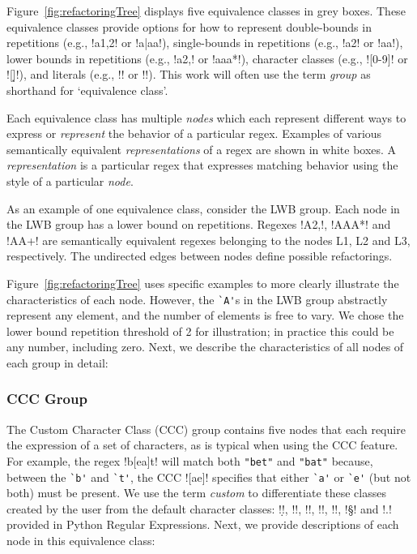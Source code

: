 Figure~\ref{fig:refactoringTree} displays five equivalence classes in grey boxes.  These equivalence classes provide options for how to represent double-bounds in repetitions (e.g., \cverb!a{1,2}! or \cverb!a|aa!), single-bounds in repetitions (e.g., \cverb!a{2}! or \cverb!aa!), lower bounds in repetitions (e.g., \cverb!a{2,}! or \cverb!aaa*!), character classes (e.g., \cverb![0-9]! or \cverb![\d]!), and literals (e.g., \cverb!\a! or \cverb!!).  This work will often use the term \emph{group} as shorthand for `equivalence class'.

Each equivalence class has multiple \emph{nodes} which each represent different ways to express or \emph{represent} the behavior of a particular regex.  Examples of various semantically equivalent \emph{representations} of a regex are shown in white boxes. A \emph{representation} is a particular regex that expresses matching behavior using the style of a particular \emph{node}.

As an example of one equivalence class, consider the LWB group.  Each node in the LWB group has a lower bound on repetitions. Regexes \cverb!A{2,}!, \cverb!AAA*! and \cverb!AA+! are semantically equivalent regexes belonging to the nodes L1, L2 and L3, respectively.
The undirected edges between nodes define possible refactorings.

Figure~\ref{fig:refactoringTree} uses specific examples to more clearly illustrate the characteristics of each node.  However, the \verb!`A'!s in the LWB group abstractly represent any element, and the number of elements is free to vary. We chose the lower bound repetition threshold of 2 for illustration; in practice this could be any number, including zero.
Next, we describe the characteristics of all nodes of each group in detail:

\subsubsection{CCC Group}
The Custom Character Class (CCC) group contains five nodes that each require the expression of a set of characters, as is typical when using the CCC feature.  For example, the regex \cverb!b[ea]t! will match both \verb!"bet"! and \verb!"bat"! because, between the \verb!`b'! and \verb!`t'!, the CCC \cverb![ae]! specifies that either \verb!`a'! or \verb!`e'! (but not both) must be present.
We use the term \emph{custom} to differentiate these classes created by the user from the default character classes: \cverb!\d!, \cverb!\D!, \cverb!\w!, \cverb!\W!, \cverb!\s!, \cverb!\S! and \cverb!.! provided in Python Regular Expressions.
Next, we provide descriptions of each node in this equivalence class:

